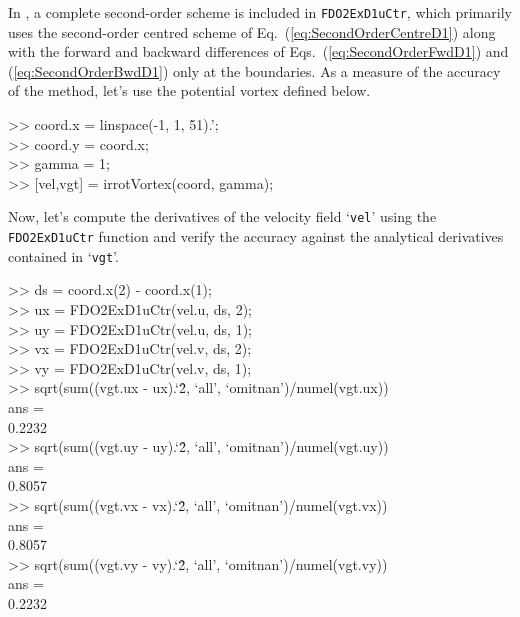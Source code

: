 \documentclass[10pt, twoside]{book}
\begin{document}
				In \MATfluids, a complete second-order scheme is included in \texttt{FDO2ExD1uCtr}, which primarily uses the second-order centred scheme of Eq.~(\ref{eq:SecondOrderCentreD1}) along with the forward and backward differences of Eqs.~(\ref{eq:SecondOrderFwdD1}) and (\ref{eq:SecondOrderBwdD1}) only at the boundaries. As a measure of the accuracy of the method, let's use the potential vortex defined below.
				\begin{code}
					>> coord.x = linspace(-1, 1, 51).';\\
					>> coord.y = coord.x;\\
					>> gamma = 1;\\
					>> [vel,vgt] = irrotVortex(coord, gamma);
				\end{code}
				Now, let's compute the derivatives of the velocity field `\texttt{vel}' using the \texttt{FDO2ExD1uCtr} function and verify the accuracy against the analytical derivatives contained in `\texttt{vgt}'.
				\begin{code}
					>> ds = coord.x(2) - coord.x(1);\\
					>> ux = FDO2ExD1uCtr(vel.u, ds, 2);\\
					>> uy = FDO2ExD1uCtr(vel.u, ds, 1);\\
					>> vx = FDO2ExD1uCtr(vel.v, ds, 2);\\
					>> vy = FDO2ExD1uCtr(vel.v, ds, 1);\\
					>> sqrt(sum((vgt.ux - ux).\char`\^2, `all', `omitnan')/numel(vgt.ux)) \\
					ans =\\
					\hspace{22pt}0.2232 \\
					>> sqrt(sum((vgt.uy - uy).\char`\^2, `all', `omitnan')/numel(vgt.uy)) \\
					ans =\\
					\hspace{22pt}0.8057 \\
					>> sqrt(sum((vgt.vx - vx).\char`\^2, `all', `omitnan')/numel(vgt.vx)) \\
					ans =\\
					\hspace{22pt}0.8057 \\
					>> sqrt(sum((vgt.vy - vy).\char`\^2, `all', `omitnan')/numel(vgt.vy)) \\
					ans =\\
					\hspace{22pt}0.2232
				\end{code}
				
\end{document}
